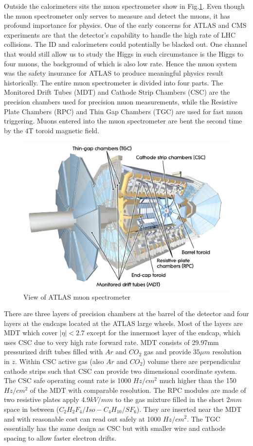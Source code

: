\label{sec:detector-mu}
Outside the calorimeters sits the muon spectrometer show in Fig.\ref{fig:detector-mu}. Even though the muon spectrometer only serves to measure and detect the muons, it has profound importance for physics. One of the early concerns for ATLAS and CMS experiments are that the detector's capability to handle the high rate of LHC collisions. The ID and calorimeters could potentially be blacked out. One channel that would still allow us to study the Higgs in such circumstance is the Higgs to four muons, the background of which is also low rate. Hence the muon system was the safety insurance for ATLAS to produce meaningful physics result historically. The entire muon spectrometer is divided into four parts. The Monitored Drift Tubes (MDT) and Cathode Strip Chambers (CSC) are the precision chambers used for precision muon measurements, while the Resistive Plate Chambers (RPC) and Thin Gap Chambers (TGC) are used for fast muon triggering. Muons entered into the muon spectrometer are bent the second time by the 4T toroid magnetic field. 

\begin{figure}[htpb!]
\begin{center}
  \includegraphics[width=0.8\linewidth]{figures/detector/muon}
\caption{View of ATLAS muon spectrometer}
\label{fig:detector-mu}
\end{center}
\end{figure}


There are three layers of precision chambers at the barrel of the detector and four layers at the endcaps located at the ATLAS large wheels. Most of the layers are MDT which cover $|\eta|<2.7$ except for the innermost layer of the endcap, which uses CSC due to very high rate forward rate. MDT consists of 29.97mm pressurized drift tubes filled with $Ar$ and $CO_2$ gas and provide $35\mu m$ resolution in $z$. Within CSC active gas (also $Ar$ and $CO_2$) volume there are perpendicular cathode strips such that CSC can provide two dimensional coordinate system. The CSC safe operating count rate is 1000 $Hz/cm^2$ much higher than the 150 $Hz/cm^2$ of the MDT with comparable resolution. The RPC modules are made of two resistive plates apply 4.9$kV/mm$ to the gas mixture filled in the short 2$mm$ space in between ($C_2H_2F_4/Iso-C_4H_{10}/SF_6$). They are inserted near the MDT and with reasonable cost can read out safely at 1000 $Hz/cm^2$. The TGC essentially has the same design as CSC but with smaller wire and cathode spacing to allow faster electron drifts. 


